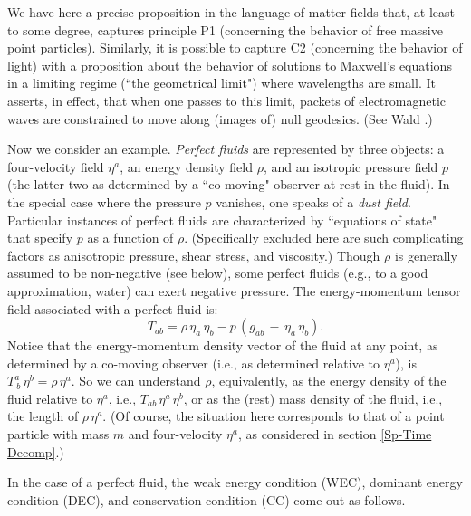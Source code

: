 \documentclass [12] {article}
\theoremstyle{plain}
\numberwithin{figure}{subsection}
\numberwithin{proposition}{subsection}
\begin{document}
We have here a precise proposition in the language of matter fields that, at least to some degree, captures principle P1   (concerning the behavior of free massive point particles). Similarly, it is possible to capture C2 (concerning the behavior of  light) with a proposition about the behavior of solutions to Maxwell's equations in a limiting regime (``the geometrical limit") where wavelengths are small.  It asserts, in effect, that when one passes to this limit, packets of electromagnetic waves are constrained to move along (images of) null geodesics. (See Wald .) 

Now we consider an example.  \emph{Perfect fluids} are represented by three objects: a four-velocity field $\eta^a$, an energy density field $\rho$, and an isotropic pressure field $p$ (the  latter two as determined by a ``co-moving" observer at rest in the fluid).    In the special case where the pressure $p$ vanishes, one speaks of a \emph{dust field}.  Particular instances of  perfect fluids are characterized by ``equations of state"  that specify $p$ as a function of $\rho$. (Specifically excluded here are such complicating factors as anisotropic pressure, shear stress, and viscosity.)  Though $\rho$ is generally assumed to be non-negative (see below), some perfect fluids (e.g., to a good approximation, water)  can exert negative pressure. The energy-momentum tensor field associated with a perfect fluid is:
%
\begin{equation} \label{T-perfect fluid}
T_{ab} = \rho \, \eta_a \, \eta_b  -  p \, (g_{ab} \, - \, \eta_a \, \eta_b).  \end{equation} 
%
Notice that the energy-momentum density vector of the fluid at any point, as determined by a co-moving observer (i.e., as determined relative to $\eta^a$), is  $T^a_{\ b}  \, \eta^b = \rho \, \eta^a$. So we can understand  $\rho$, equivalently, as the energy density of the fluid relative to $\eta^a$, i.e., $T_{a b}  \, \eta^a \, \eta^b$,   or as the (rest) mass density of the fluid, i.e.,  the length of $\rho \, \eta^a$.  (Of course, the situation here corresponds to that of a  point particle with mass $m$ and four-velocity $\eta^a$, as considered in section \ref{Sp-Time Decomp}.)     

In the case of a perfect fluid, the weak energy condition (WEC), dominant energy condition (DEC), and conservation condition (CC) come out as follows.



\end{document}
